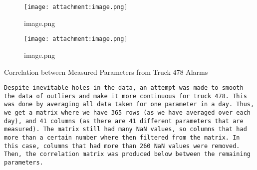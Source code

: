 \documentclass[11pt]{article}
\makeatletter
\def\maxwidth{\ifdim\Gin@nat@width>\linewidth\linewidth
    \else\Gin@nat@width\fi}
\let\Oldincludegraphics\includegraphics
\renewcommand{\includegraphics}[1]{\Oldincludegraphics[width=.8\maxwidth]{#1}}
\makeatother
\begin{document}
    \begin{figure}
\centering
\texttt{[image: attachment:image.png]}
\caption{image.png}
\end{figure}

    \begin{figure}
\centering
\texttt{[image: attachment:image.png]}
\caption{image.png}
\end{figure}

    Correlation between Measured Parameters from Truck 478 Alarms

\begin{verbatim}
Despite inevitable holes in the data, an attempt was made to smooth the data of outliers and make it more continuous for truck 478. This was done by averaging all data taken for one parameter in a day. Thus, we get a matrix where we have 365 rows (as we have averaged over each day), and 41 columns (as there are 41 different parameters that are measured). The matrix still had many NaN values, so columns that had more than a certain number where then filtered from the matrix. In this case, columns that had more than 260 NaN values were removed.  Then, the correlation matrix was produced below between the remaining parameters.
\end{verbatim}
\end{document}
